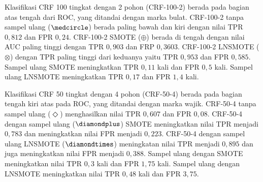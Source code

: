 Klasifikasi CRF 100 tingkat dengan 2 pohon (CRF-100-2) berada pada bagian atas
tengah dari ROC, yang ditandai dengan marka bulat.
CRF-100-2 tanpa sampel ulang ($\medcircle$) berada paling bawah dan kiri dengan
nilai TPR $0,812$ dan FPR $0,24$.
CRF-100-2 SMOTE ($\oplus$) berada di tengah dengan nilai AUC paling tinggi
dengan TPR $0,903$ dan FRP $0,3603$.
CRF-100-2 LNSMOTE ($\otimes$) dengan TPR paling tinggi dari keduanya yaitu TPR
$0,953$ dan FPR $0,585$.
Sampel ulang SMOTE meningkatkan TPR $0,11$ kali dan FPR $0,5$ kali.
Sampel ulang LNSMOTE meningkatkan TPR $0,17$ dan FPR $1,4$ kali.

Klasifikasi CRF 50 tingkat dengan 4 pohon (CRF-50-4) berada pada bagian tengah
kiri atas pada ROC, yang ditandai dengan marka wajik.
CRF-50-4 tanpa sampel ulang ($\Diamond$) menghasilkan nilai TPR $0,607$ dan FPR
$0,08$.
CRF-50-4 dengan sampel ulang ($\diamondplus$) SMOTE meningkatkan nilai TPR
menjadi $0,783$ dan meningkatkan nilai FPR menjadi $0,223$.
CRF-50-4 dengan sampel ulang LNSMOTE ($\diamondtimes$) meningkatan nilai TPR
menjadi $0,895$ dan juga meningkatkan nilai FPR menjadi $0,388$.
Sampel ulang dengan SMOTE meningkatkan nilai TPR $0,3$ kali dan FPR $1,75$
kali.
Sampel ulang dengan LNSMOTE meningkatkan nilai TPR $0,48$ kali dan FPR $3,75$.

